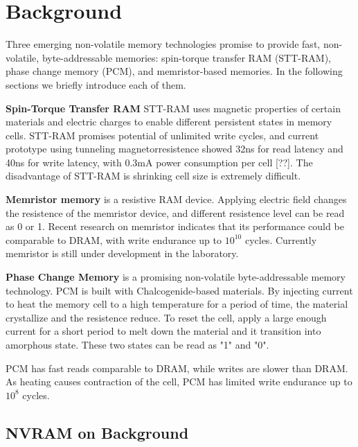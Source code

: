 \section{Background}
\label{sec:background}

Three emerging non-volatile memory technologies promise to provide fast,
 non-volatile, byte-addressable memories: spin-torque transfer RAM (STT-RAM),
phase change memory (PCM), and memristor-based memories. In the following
sections we briefly introduce each of them.

\textbf{Spin-Torque Transfer RAM} STT-RAM uses magnetic properties of 
certain materials and electric charges to enable different persistent states 
in memory cells. STT-RAM promises potential of unlimited write cycles, and
current prototype using tunneling magnetorresistence showed 32ns for
read latency and 40ns for write latency, with 0.3mA power consumption
per cell [??]. The disadvantage of STT-RAM is shrinking cell size is
extremely difficult.

\textbf{Memristor memory} is a resistive RAM device. Applying electric field
changes the resistence of the memristor device, and different resistence level
can be read as 0 or 1. Recent research on memristor indicates that its
performance could be comparable to DRAM, with write endurance up to $10^{10}$
cycles. Currently memristor is still under development in the laboratory.

\textbf{Phase Change Memory} is a promising non-volatile byte-addressable
memory technology. PCM is built with Chalcogenide-based materials. By
injecting current to heat the memory cell to a high temperature for a period
of time, the material crystallize and the resistence reduce. To reset the cell,
apply a large enough current for a short period to melt down the
material and it transition into amorphous state. These two states can be read as
"1" and "0". 

PCM has fast reads comparable to DRAM, while writes are slower than DRAM.
As heating causes contraction of the cell, PCM has limited write endurance
up to $10^8$ cycles.
 
\subsection{NVRAM on Background}
\label{sec:background}

